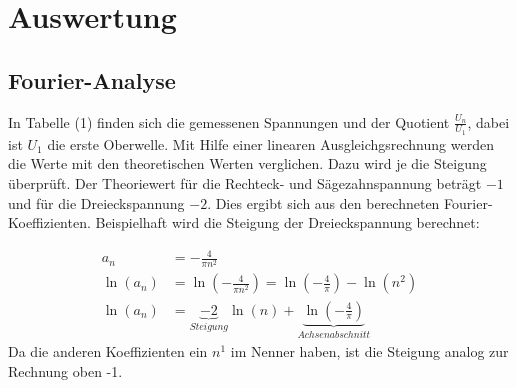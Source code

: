 \section{Auswertung}
\label{sec:Auswertung}

\subsection{Fourier-Analyse}
In Tabelle (1) finden sich die gemessenen Spannungen und der Quotient $\frac{U_n}{U_1}$, dabei ist $U_1$ die erste Oberwelle. Mit Hilfe einer linearen Ausgleichgsrechnung werden die Werte mit den theoretischen
Werten verglichen. Dazu wird je die Steigung überprüft. Der Theoriewert für die Rechteck- und Sägezahnspannung beträgt $-1$ und für
die Dreieckspannung $-2$. Dies ergibt sich aus den berechneten Fourier-Koeffizienten. Beispielhaft wird die Steigung der Dreieckspannung berechnet:

\begin{align*}
  a_n &= -\frac{4}{\pi n^2} \\
  \ln{(a_n)} &= \ln{(-\frac{4}{\pi n^2})} = \ln{(-\frac{4}{\pi})} - \ln{(n^2)} \\
  \ln{(a_n)} &= \underbrace{-2}_{Steigung} \ln{(n)} + \underbrace{\ln{(-\frac{4}{\pi})}}_{Achsenabschnitt}
\end{align*}
\noindent Da die anderen Koeffizienten ein $n^1$ im Nenner haben, ist die Steigung analog zur Rechnung oben -1.






